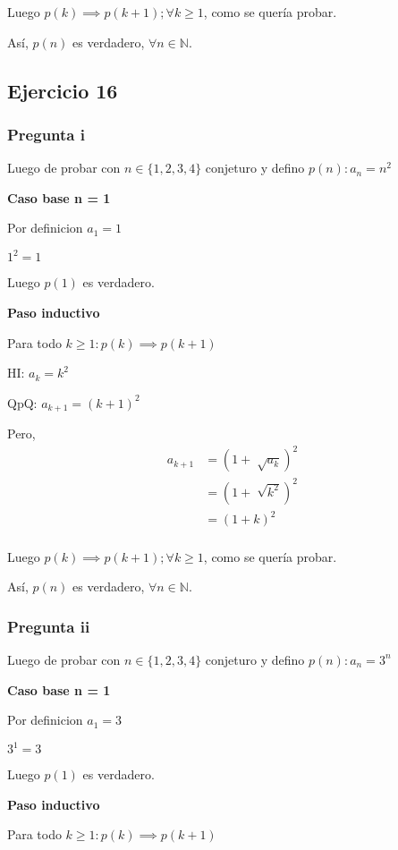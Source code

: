 Luego $p(k) \implies p(k+1); \forall k \geq 1$, como se quería probar.

Así, $p(n)$ es verdadero, $\forall n \in \mathbb{N}$.

\subsection{Ejercicio 16}

\subsubsection{Pregunta i}

Luego de probar con $ n \in \{ 1,2,3,4 \} $ conjeturo y defino $ p(n): a_n = n^2 $

\textbf{Caso base n = 1}

Por definicion $ a_1 = 1$

$ 1^2 = 1$

Luego $ p(1) $ es verdadero.

\textbf{Paso inductivo}

Para todo $k \geq 1: p(k) \implies p(k+1)$

HI: $ a_k = k^2$

QpQ: $ a_{k+1} = (k+1)^2$

Pero,
\begin{align*}
    a_{k+1} &= (1+\sqrt[]{a_k})^2 \\
    &= (1+\sqrt[]{k^2})^2 \\
    &= (1+k)^2 \\
\end{align*}

Luego $p(k) \implies p(k+1); \forall k \geq 1$, como se quería probar.

Así, $p(n)$ es verdadero, $\forall n \in \mathbb{N}$.

\subsubsection{Pregunta ii}

Luego de probar con $ n \in \{ 1,2,3,4 \} $ conjeturo y defino $ p(n): a_n = 3^n $

\textbf{Caso base n = 1}

Por definicion $ a_1 = 3$

$ 3^1 = 3$

Luego $ p(1) $ es verdadero.

\textbf{Paso inductivo}

Para todo $k \geq 1: p(k) \implies p(k+1)$

